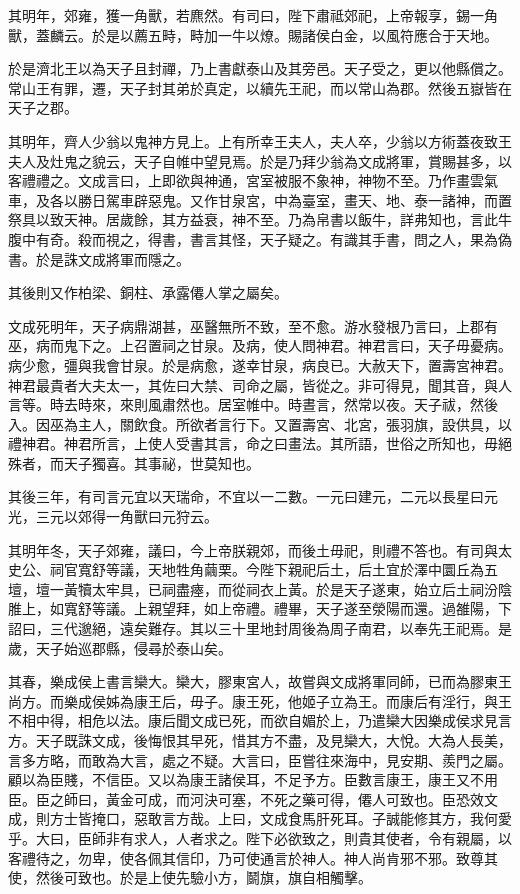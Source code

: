 其明年，郊雍，獲一角獸，若麃然。有司曰，陛下肅祗郊祀，上帝報享，錫一角獸，蓋麟云。於是以薦五畤，畤加一牛以燎。賜諸侯白金，以風符應合于天地。

於是濟北王以為天子且封禪，乃上書獻泰山及其旁邑。天子受之，更以他縣償之。常山王有罪，遷，天子封其弟於真定，以續先王祀，而以常山為郡。然後五嶽皆在天子之郡。

其明年，齊人少翁以鬼神方見上。上有所幸王夫人，夫人卒，少翁以方術蓋夜致王夫人及灶鬼之貌云，天子自帷中望見焉。於是乃拜少翁為文成將軍，賞賜甚多，以客禮禮之。文成言曰，上即欲與神通，宮室被服不象神，神物不至。乃作畫雲氣車，及各以勝日駕車辟惡鬼。又作甘泉宮，中為臺室，畫天、地、泰一諸神，而置祭具以致天神。居歲餘，其方益衰，神不至。乃為帛書以飯牛，詳弗知也，言此牛腹中有奇。殺而視之，得書，書言其怪，天子疑之。有識其手書，問之人，果為偽書。於是誅文成將軍而隱之。

其後則又作柏梁、銅柱、承露僊人掌之屬矣。

文成死明年，天子病鼎湖甚，巫醫無所不致，至不愈。游水發根乃言曰，上郡有巫，病而鬼下之。上召置祠之甘泉。及病，使人問神君。神君言曰，天子毋憂病。病少愈，彊與我會甘泉。於是病愈，遂幸甘泉，病良已。大赦天下，置壽宮神君。神君最貴者大夫太一，其佐曰大禁、司命之屬，皆從之。非可得見，聞其音，與人言等。時去時來，來則風肅然也。居室帷中。時晝言，然常以夜。天子祓，然後入。因巫為主人，關飲食。所欲者言行下。又置壽宮、北宮，張羽旗，設供具，以禮神君。神君所言，上使人受書其言，命之曰畫法。其所語，世俗之所知也，毋絕殊者，而天子獨喜。其事祕，世莫知也。

其後三年，有司言元宜以天瑞命，不宜以一二數。一元曰建元，二元以長星曰元光，三元以郊得一角獸曰元狩云。

其明年冬，天子郊雍，議曰，今上帝朕親郊，而後土毋祀，則禮不答也。有司與太史公、祠官寬舒等議，天地牲角繭栗。今陛下親祀后土，后土宜於澤中圜丘為五壇，壇一黃犢太牢具，已祠盡瘞，而從祠衣上黃。於是天子遂東，始立后土祠汾陰脽上，如寬舒等議。上親望拜，如上帝禮。禮畢，天子遂至滎陽而還。過雒陽，下詔曰，三代邈絕，遠矣難存。其以三十里地封周後為周子南君，以奉先王祀焉。是歲，天子始巡郡縣，侵尋於泰山矣。

其春，樂成侯上書言欒大。欒大，膠東宮人，故嘗與文成將軍同師，已而為膠東王尚方。而樂成侯姊為康王后，毋子。康王死，他姬子立為王。而康后有淫行，與王不相中得，相危以法。康后聞文成已死，而欲自媚於上，乃遣欒大因樂成侯求見言方。天子既誅文成，後悔恨其早死，惜其方不盡，及見欒大，大悅。大為人長美，言多方略，而敢為大言，處之不疑。大言曰，臣嘗往來海中，見安期、羨門之屬。顧以為臣賤，不信臣。又以為康王諸侯耳，不足予方。臣數言康王，康王又不用臣。臣之師曰，黃金可成，而河決可塞，不死之藥可得，僊人可致也。臣恐效文成，則方士皆掩口，惡敢言方哉。上曰，文成食馬肝死耳。子誠能修其方，我何愛乎。大曰，臣師非有求人，人者求之。陛下必欲致之，則貴其使者，令有親屬，以客禮待之，勿卑，使各佩其信印，乃可使通言於神人。神人尚肯邪不邪。致尊其使，然後可致也。於是上使先驗小方，鬬旗，旗自相觸擊。

